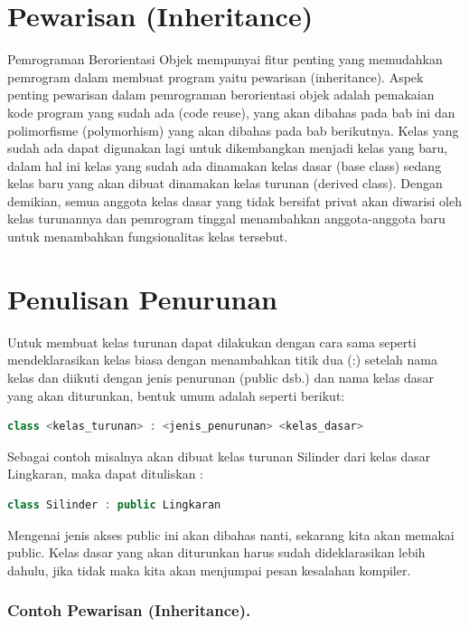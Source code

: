 
\section{Pewarisan (Inheritance)}\label{pewarisan-inheritance}

Pemrograman Berorientasi Objek mempunyai fitur penting yang memudahkan
pemrogram dalam membuat program yaitu pewarisan (inheritance). Aspek
penting pewarisan dalam pemrograman berorientasi objek adalah pemakaian
kode program yang sudah ada (code reuse), yang akan dibahas pada bab ini
dan polimorfisme (polymorhism) yang akan dibahas pada bab berikutnya.
Kelas yang sudah ada dapat digunakan lagi untuk dikembangkan menjadi
kelas yang baru, dalam hal ini kelas yang sudah ada dinamakan kelas
dasar (base class) sedang kelas baru yang akan dibuat dinamakan kelas
turunan (derived class). Dengan demikian, semua anggota kelas dasar yang
tidak bersifat privat akan diwarisi oleh kelas turunannya dan pemrogram
tinggal menambahkan anggota-anggota baru untuk menambahkan
fungsionalitas kelas tersebut.

\section{Penulisan Penurunan}\label{penulisan-penurunan}

Untuk membuat kelas turunan dapat dilakukan dengan cara sama seperti
mendeklarasikan kelas biasa dengan menambahkan titik dua (:) setelah
nama kelas dan diikuti dengan jenis penurunan (public dsb.) dan nama
kelas dasar yang akan diturunkan, bentuk umum adalah seperti berikut:

\begin{lstlisting}[language=c++, numbers=none]
class <kelas_turunan> : <jenis_penurunan> <kelas_dasar>
\end{lstlisting}

Sebagai contoh misalnya akan dibuat kelas turunan Silinder dari kelas
dasar Lingkaran, maka dapat dituliskan :

\begin{lstlisting}[language=c++, numbers=none]
class Silinder : public Lingkaran
\end{lstlisting}

Mengenai jenis akses public ini akan dibahas nanti, sekarang kita akan
memakai public. Kelas dasar yang akan diturunkan harus sudah
dideklarasikan lebih dahulu, jika tidak maka kita akan menjumpai pesan
kesalahan kompiler.

\subsubsection*{Contoh Pewarisan (Inheritance).}

